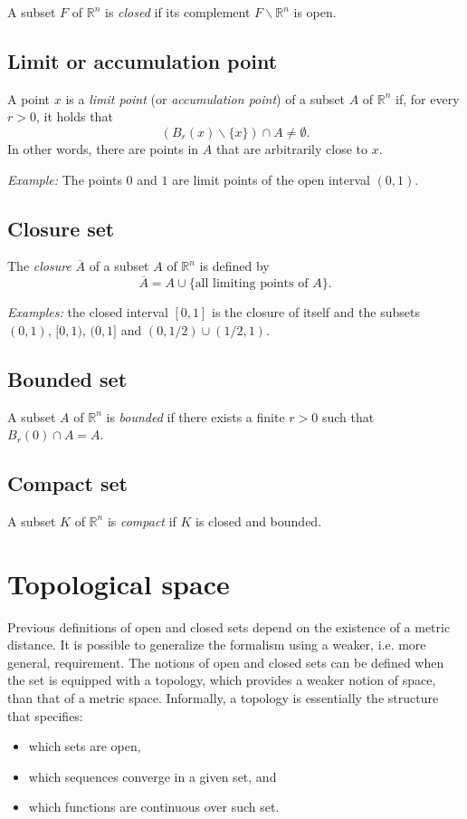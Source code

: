 \documentclass[aps,prl,twocolumn,groupedaddress]{revtex4-2}
\newcommand{\RR}{\mathbb{R}}
\begin{document}
A subset $F$ of $\RR^n$ is {\em closed} if its complement $F\backslash \RR^n$ is open.

\subsection{
Limit or accumulation point
\label{sec:limit_point_metric}
}

A point $x$ is a {\em limit point} (or {\em accumulation point}) of a subset $A$ of $\RR^n$ if, for every $r>0$, it holds that
$$
(B_r(x)\backslash \{x\})\cap A \neq \emptyset.
$$
In other words, there are points in $A$ that are arbitrarily close to $x$.

{\em Example:}
The points $0$ and $1$ are limit points of the open interval $(0,1)$.

\subsection{Closure set}

The {\em closure} $\overline{A}$ of a subset $A$ of $\RR^n$ is defined by
$$
\overline{A}
=
A \cup \{\mbox{all limiting points of $A$}\}.
$$

{\em Examples:} the closed interval $[0,1]$ is the closure of itself and the subsets $(0,1)$, $[0,1)$, $(0,1]$ and $(0,1/2)\cup (1/2,1)$.

\subsection{Bounded set}

A subset $A$ of $\RR^n$ is {\em bounded} if there exists a finite $r>0$ such that $B_r(0)\cap A=A$.

\subsection{Compact set}

A subset $K$ of $\RR^n$ is {\em compact} if $K$ is closed and bounded.

\section{Topological space}

Previous definitions of open and closed sets depend on the existence of a metric distance.
It is possible to generalize the formalism using a weaker, i.e. more general, requirement.
The notions of open and closed sets can be defined when the set is equipped with a topology, which provides a weaker notion of space, than that of a metric space.
Informally, a topology is essentially the structure that specifies:
\begin{itemize}
\item which sets are open,
\item which sequences converge in a given set, and
\item which functions are continuous over such set.
\end{itemize}
\end{document}
